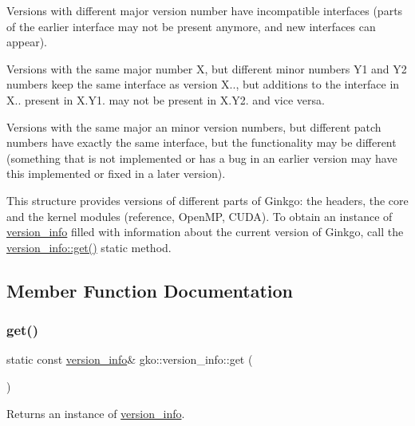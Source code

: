 \begin{DoxyEnumerate}
\item Versions with different major version number have incompatible interfaces (parts of the earlier interface may not be present anymore, and new interfaces can appear).
\item Versions with the same major number X, but different minor numbers Y1 and Y2 numbers keep the same interface as version X.., but additions to the interface in X.. present in X.\+Y1. may not be present in X.\+Y2. and vice versa.
\item Versions with the same major an minor version numbers, but different patch numbers have exactly the same interface, but the functionality may be different (something that is not implemented or has a bug in an earlier version may have this implemented or fixed in a later version).
\end{DoxyEnumerate}

This structure provides versions of different parts of Ginkgo\+: the headers, the core and the kernel modules (reference, Open\+MP, C\+U\+DA). To obtain an instance of \hyperlink{classgko_1_1version__info}{version\+\_\+info} filled with information about the current version of Ginkgo, call the \hyperlink{classgko_1_1version__info_a6daeb8a087cfb57fa055526fc133d8eb}{version\+\_\+info\+::get()} static method. 

\subsection{Member Function Documentation}
\mbox{\label{classgko_1_1version__info_a6daeb8a087cfb57fa055526fc133d8eb}} 
\subsubsection{\texorpdfstring{get()}{get()}}
{\footnotesize\ttfamily static const \hyperlink{classgko_1_1version__info}{version\+\_\+info}\& gko\+::version\+\_\+info\+::get (\begin{DoxyParamCaption}{ }\end{DoxyParamCaption})\hspace{0.3cm}{\ttfamily [static]}}



Returns an instance of \hyperlink{classgko_1_1version__info}{version\+\_\+info}. 

